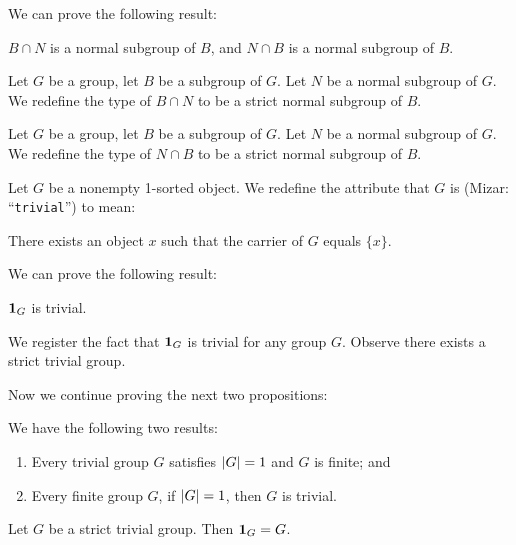 \documentclass{article}
\begin{document}
We can prove the following result:
\begin{thm}
\item\label{group6:9} $B\cap N$ is a normal subgroup of $B$, and $N\cap B$
  is a normal subgroup of $B$.
\end{thm}

\begin{definition}
Let $G$ be a group, let $B$ be a subgroup of $G$.
Let $N$ be a normal subgroup of $G$.
We redefine the type of $B\cap N$ to be a strict normal subgroup of $B$.
\end{definition}

\begin{definition}
Let $G$ be a group, let $B$ be a subgroup of $G$.
Let $N$ be a normal subgroup of $G$.
We redefine the type of $N\cap B$ to be a strict normal subgroup of $B$.
\end{definition}



\begin{definition}
Let $G$ be a nonempty 1-sorted object. We redefine the attribute that
$G$ is  (Mizar: ``\verb#trivial#'') to mean:
\begin{defn}
\item There exists an object $x$ such that the carrier of $G$ equals $\{x\}$.
\end{defn}
\end{definition}

We can prove the following result:
\begin{thm}
\item\label{group6:10} $\mathbf{1}_{G}$ is trivial.
\end{thm}

We register the fact that $\mathbf{1}_{G}$ is trivial for any group $G$.
Observe there exists a strict trivial group.

Now we continue proving the next two propositions:
\begin{thm}
\item\label{group6:11} We have the following two results:
  \begin{enumerate}[label=(\roman*)]
  \item Every trivial group $G$ satisfies $|G|=1$
  and $G$ is finite; and
  \item Every finite group $G$, if $|G|=1$, then $G$ is trivial. 
  \end{enumerate}
\item\label{group6:12} Let $G$ be a strict trivial group. Then $\mathbf{1}_{G}=G$.
\end{thm}
\end{document}
